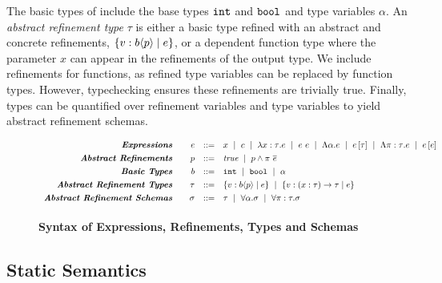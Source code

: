 The basic types of \corelan include the base types $\texttt{int}$ and $\texttt{bool}$
and type variables $\alpha$. An \emph{abstract refinement type} $\tau$ is 
either a basic type refined with an abstract and concrete refinements,
$\left\lbrace v : {b \langle p \rangle}\mid e\right\rbrace$, or 
a dependent function type where the parameter $x$ can appear in the 
refinements of the output type. 
We include refinements for functions, as refined type variables can be 
replaced by function types. However, typechecking ensures these refinements
are trivially true.
%
%
Finally, types can be quantified over refinement variables and type 
variables to yield abstract refinement schemas.


\begin{figure}[t!]
\centering
$$
\begin{array}{rrcl}
\emphbf{Expressions} \quad 
  & e 
  & ::= 
  &      x 
  \spmid c 
  \spmid \efunt{x}{\tau}{e} 
  \spmid \eapp{e}{e} 
  \spmid \etabs{\alpha}{e} 
  \spmid \etapp{e}{\tau} 
  \spmid \epabs{\rvar}{\tau}{e}
  \spmid \epapp{e}{e} 
  \\[0.05in] 

\emphbf{Abstract Refinements} \quad 
  & \areft 
  & ::= 
  &      \true 
  \spmid \areft \land \rvapp{\rvar}{e}
  \\[0.05in] 

\emphbf{Basic Types} \quad 
  & b 
  & ::= 
  &      \tbint
  \spmid \tbbool
  \spmid \alpha
  \\[0.05in]

\emphbf{Abstract Refinement Types} \quad 
  & \tau 
  & ::= 
  &      \tpref{b}{\areft}{\reft} 
  \spmid \trfun{x}{\tau}{\tau}{\reft}
  \\[0.05in]

\emphbf{Abstract Refinement Schemas} \quad 
  & \sigma
  & ::= 
  &      \tau 
  \spmid \ttabs{\alpha}{\sigma}
  \spmid \tpabs{\rvar}{\tau}{\sigma}
  \\[0.05in]
\end{array}
$$
\caption{\textbf{Syntax of Expressions, Refinements, Types and Schemas}}
\label{fig:syntax}
\end{figure}

\subsection{Static Semantics}\label{sec:typing}

